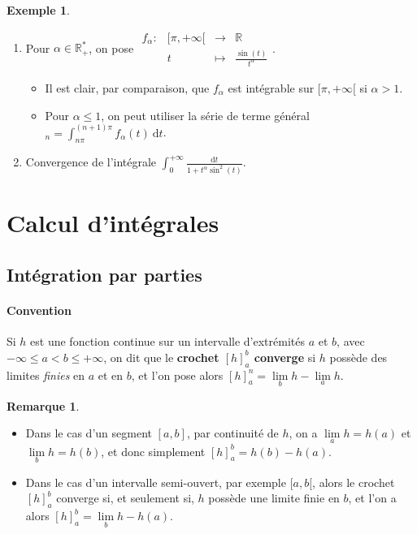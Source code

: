\documentclass[french]{article}
\newcommand{\R}{\mathbb{R}}
\newcommand{\st}{^*}
\renewcommand{\d}{\text{d}}
\theoremstyle{plain}
\theoremstyle{definition}
\newtheorem*{ex}{Exemple}
\newtheorem*{rmq}{Remarque}
\theoremstyle{remark}
\begin{document}
\begin{ex}
	\begin{enumerate}
		\item Pour $\alpha\in\R_+\st$, on pose $\begin{array}{lrcl}
			f_\alpha:&[\pi,+\infty[&\longrightarrow&\R\\
			&t&\longmapsto&\displaystyle\frac{\sin(t)}{t^{\alpha}}
		\end{array}$.
		\begin{itemize}
			\item Il est clair, par comparaison, que $f_\alpha$ est intégrable sur $[\pi,+\infty[$ si $\alpha>1$.
			\item Pour $\alpha\leqslant1$, on peut utiliser la série de terme général $_n=\displaystyle\int_{n\pi}^{(n+1)\pi}f_\alpha(t)\ \d t$.
		\end{itemize}
		\item Convergence de l'intégrale $\displaystyle\int_{0}^{+\infty}\frac{\d t}{1+t^{\alpha}\sin^2(t)}$.
	\end{enumerate}
\end{ex}

\section{Calcul d'intégrales}

\subsection{Intégration par parties}

\paragraph{Convention} Si $h$ est une fonction continue sur un intervalle d'extrémités $a$ et $b$, avec $-\infty\leqslant a<b\leqslant+\infty$, on dit que le \textbf{crochet $[h]_a^b$ converge} si $h$ possède des limites \textit{finies} en $a$ et en $b$, et l'on pose alors $[h]_a^n=\underset{b}{\lim}h-\underset{a}{\lim}h$.

\begin{rmq}
	\begin{itemize}
		\item Dans le cas d'un segment $[a,b]$, par continuité de $h$, on a $\underset{a}{\lim}h=h(a)$ et $\underset{b}{\lim}h=h(b)$, et donc simplement $[h]_a^b=h(b)-h(a)$.
		\item Dans le cas d'un intervalle semi-ouvert, par exemple $[a,b[$, alors le crochet $[h]_a^b$ converge si, et seulement si, $h$ possède une limite finie en $b$, et l'on a alors $[h]_a^b=\underset{b}{\lim}h-h(a)$.
	\end{itemize}
\end{rmq}
\end{document}
